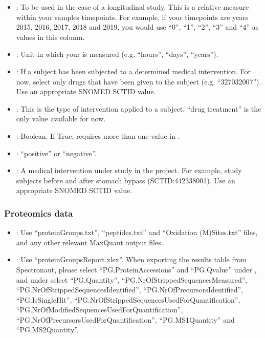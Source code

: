 \documentclass[letterpaper,10pt,english]{sphinxmanual}
\begin{document}
\begin{itemize}
\item {} 
: To be used in the case of a longitudinal study. This is a relative measure within your samples timepoints. For example, if your timepoints are years 2015, 2016, 2017, 2018 and 2019, you would use “0”, “1”, “2”, “3” and “4” as values in this column.

\item {} 
: Unit in which your  is measured (e.g. “hours”, “days”, “years”).

\item {} 
: If a subject has been subjected to a determined medical intervention. For now, select only drugs that have been given to the subject (e.g. “327032007”). Use an appropriate SNOMED SCTID value.

\item {} 
: This is the type of intervention applied to a subject. “drug treatment” is the only value available for now.

\item {} 
: Boolean. If True, requires more than one value in .

\item {} 
: “positive” or “negative”.

\item {} 
: A medical intervention under study in the project. For example, study subjects before and after stomach bypass (SCTID:442338001). Use an appropriate SNOMED SCTID value.

\end{itemize}


\subsubsection{Proteomics data}
\label{\detokenize{getting_started/upload-data:proteomics-data}}\begin{itemize}
\item {} 
: Use “proteinGroups.txt”, “peptides.txt” and “Oxidation (M)Sites.txt” files, and any other relevant MaxQuant output files.

\item {} 
: Use “proteinGroupsReport.xlsx”. When exporting the results table from Spectronaut, please select “PG.ProteinAccessions” and “PG.Qvalue” under , and under  select “PG.Quantity”, “PG.NrOfStrippedSequencesMeasured”, “PG.NrOfStrippedSequencesIdentified”, “PG.NrOfPrecursorsIdentified”, “PG.IsSingleHit”, “PG.NrOfStrippedSequencesUsedForQuantification”, “PG.NrOfModifiedSequencesUsedForQuantification”, “PG.NrOfPrecursorsUsedForQuantification”, “PG.MS1Quantity” and “PG.MS2Quantity”.

\end{itemize}
\end{document}
